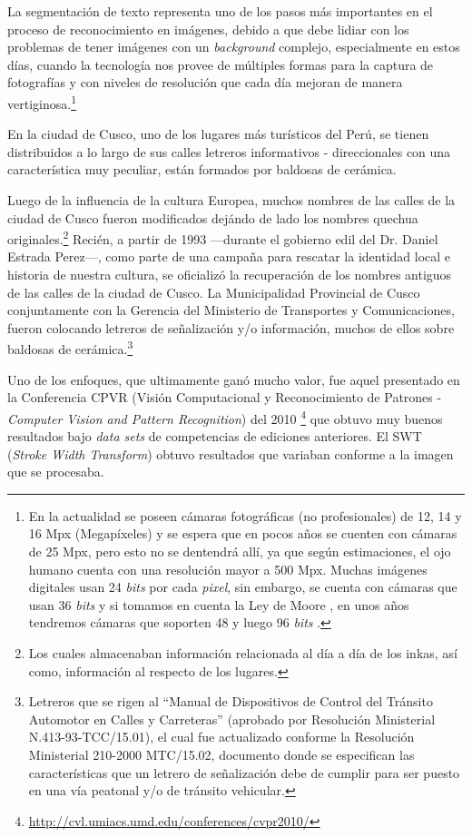La segmentación de texto representa uno de los pasos más importantes en el
proceso de reconocimiento en imágenes, debido a que debe lidiar con los
problemas de tener imágenes con un \textit{background} complejo, especialmente
en estos días, cuando la tecnología nos provee de múltiples formas para la
captura de fotografías y con niveles de resolución que cada día mejoran de
manera vertiginosa.\footnote{En la actualidad se poseen cámaras fotográficas (no
profesionales) de 12, 14 y 16 Mpx (Megapíxeles) y se espera que en pocos años se
cuenten con cámaras de 25 Mpx, pero esto no se dentendrá allí, ya que según
estimaciones, el ojo humano cuenta con una resolución mayor a 500 Mpx. Muchas
imágenes digitales usan 24 \textit{bits} por cada \textit{pixel}, sin embargo,
se cuenta con cámaras que usan 36 \textit{bits} y si tomamos en cuenta la Ley de
Moore \citep{Moore:1965:CCIC}, en unos años tendremos cámaras que soporten 48 y
luego 96 \textit{bits} \citep{Myhrvold:2006:MLCPP}.}

En la ciudad de Cusco, uno de los lugares más turísticos del Perú, se tienen
distribuidos a lo largo de sus calles letreros informativos - direccionales con
una característica muy peculiar, están formados por baldosas de cerámica.

Luego de la influencia de la cultura Europea, muchos nombres de las calles de la
ciudad de Cusco fueron modificados dejándo de lado los nombres quechua
originales.\footnote{Los cuales almacenaban información relacionada al día a día
de los inkas, así como, información al respecto de los lugares.} Recién, a
partir de 1993 ---durante el gobierno edil del Dr. Daniel Estrada Perez---, como
parte de una campaña para rescatar la identidad local e historia de nuestra
cultura,  se oficializó la recuperación de los nombres antiguos de las calles de
la ciudad de Cusco. La Municipalidad Provincial de Cusco conjuntamente con la
Gerencia del Ministerio de Transportes y Comunicaciones, fueron colocando
letreros de señalización y/o información, muchos de ellos sobre baldosas de
cerámica.\footnote{Letreros que se rigen al ``Manual de Dispositivos de Control
del Tránsito Automotor en Calles y Carreteras'' (aprobado por Resolución
Ministerial N.413-93-TCC/15.01), el cual fue actualizado conforme la Resolución
Ministerial 210-2000 MTC/15.02, documento \citep{MTC:MDCTACC} donde se
especifican las características que un letrero de señalización debe de cumplir
para ser puesto en una vía peatonal y/o de tránsito vehicular.}

Uno de los enfoques, que ultimamente ganó mucho valor, fue aquel presentado en 
la Conferencia CPVR (Visión Computacional y Reconocimiento de Patrones - 
\textit{Computer Vision and Pattern Recognition}) del 2010
\footnote{\url{http://cvl.umiacs.umd.edu/conferences/cvpr2010/}} que obtuvo
muy buenos resultados bajo \textit{data sets} de competencias de ediciones 
anteriores. El SWT (\textit{Stroke Width Transform}) obtuvo resultados que 
variaban conforme a la imagen que se procesaba.

